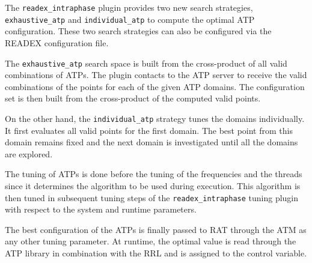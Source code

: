 The \texttt{readex\_intraphase} plugin provides two new search strategies, \linebreak \texttt{exhaustive\_atp} and \texttt{individual\_atp} to compute the optimal ATP configuration. These two search strategies can also be configured via the READEX configuration file.

The \texttt{exhaustive\_atp} search space is built from the cross-product of all valid combinations of ATPs. The plugin contacts to the ATP server to receive the valid combinations of the points for each of the given ATP domains. The configuration set is then built from the cross-product of the computed valid points. 

On the other hand, the \texttt{individual\_atp} strategy tunes the domains individually. It first evaluates all valid points for the first domain. The best point from this domain remains fixed and the next domain is investigated until all the domains are explored.  

The tuning of ATPs is done before the tuning of the frequencies and the threads since it determines the algorithm to be used during execution. This algorithm is then tuned in subsequent tuning steps of the \texttt{readex\_intraphase} tuning plugin with respect to the system and runtime parameters. 

The best configuration of the ATPs is finally passed to RAT through the ATM as any other tuning parameter. At runtime, the optimal value is read through the ATP library in combination with the RRL and is assigned to the control variable.

